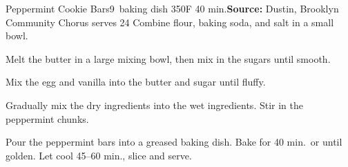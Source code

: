 \begin{recipe}{Peppermint Cookie Bars}{9\inch{}\inch\ baking dish \hfill 350\0F \hfill 40 min.}{\textbf{Source:} Dustin, Brooklyn Community Chorus \hfill serves 24}
 Combine flour, baking soda, and salt in a small bowl.

 Melt the butter in a large mixing bowl, then mix in the sugars until smooth.

 Mix the egg and vanilla into the butter and sugar until fluffy.

 Gradually mix the dry ingredients into the wet ingredients. Stir in the peppermint chunks.

 \newstep Pour the peppermint bars into a greased baking dish. Bake for 40 min.\ or until golden. Let cool 45--60 min., slice and serve.
\end{recipe}
